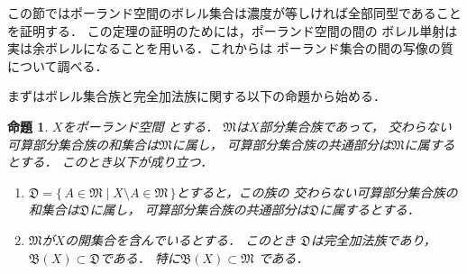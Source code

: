 \documentclass[leqno, 12pt]{jsarticle}
\newtheorem{prop}[thm]{命題}
\newcommand{\mybb}[1]{\mathfrak{B}(#1)}
\begin{document}
この節ではポーランド空間のボレル集合は濃度が等しければ全部同型であることを証明する．
この定理の証明のためには，ポーランド空間の間の
ボレル単射は実は余ボレルになることを用いる．これからは
ポーランド集合の間の写像の質について調べる．


まずはボレル集合族と完全加法族に関する以下の命題から始める．
\begin{prop}\label{prop:setalgebra}
$X$をポーランド空間
とする．
$\mathfrak{M}$は$X$部分集合族であって，
交わらない可算部分集合族の和集合は$\mathfrak{M}$に属し，
可算部分集合族の共通部分は$\mathfrak{M}$に属するとする．
このとき以下が成り立つ．
\begin{enumerate}[label=\textup{(\arabic*)}]
\item\label{item:m:1}
$\mathfrak{D}=\{\, A\in \mathfrak{M}\mid X\setminus A\in \mathfrak{M}\, \}$とすると，この族の
交わらない可算部分集合族の和集合は$\mathfrak{D}$に属し，
可算部分集合族の共通部分は$\mathfrak{D}$に属するとする．
\item\label{item:m:2}
$\mathfrak{M}$が$X$の開集合を含んでいるとする．
このとき
$\mathfrak{D}$は完全加法族であり，
$\mybb{X}\subset \mathfrak{D}$である．
特に$\mybb{X}\subset\mathfrak{M}$
である．

\end{enumerate}
\end{prop}
\end{document}
